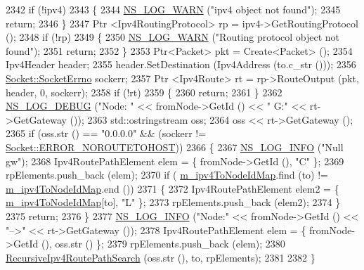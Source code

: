 \begin{DoxyCode}
2342   \textcolor{keywordflow}{if} (!ipv4)
2343     \{
2344       \hyperlink{group__logging_gade7208b4009cdf0e25783cd26766f559}{NS\_LOG\_WARN} (\textcolor{stringliteral}{"ipv4 object not found"});
2345       \textcolor{keywordflow}{return};
2346     \}
2347   Ptr <Ipv4RoutingProtocol> rp = ipv4->GetRoutingProtocol ();
2348   \textcolor{keywordflow}{if} (!rp)
2349     \{
2350       \hyperlink{group__logging_gade7208b4009cdf0e25783cd26766f559}{NS\_LOG\_WARN} (\textcolor{stringliteral}{"Routing protocol object not found"});
2351       \textcolor{keywordflow}{return};
2352     \}
2353   Ptr<Packet> pkt = Create<Packet> ();
2354   Ipv4Header header;
2355   header.SetDestination (Ipv4Address (to.c\_str ()));
2356   \hyperlink{classns3_1_1Socket_ada1328c5ae0c28cb2a982caf8f6d6cca}{Socket::SocketErrno} sockerr;
2357   Ptr <Ipv4Route> rt = rp->RouteOutput (pkt, header, 0, sockerr);
2358   \textcolor{keywordflow}{if} (!rt)
2359     \{
2360       \textcolor{keywordflow}{return};
2361     \}
2362   \hyperlink{group__logging_ga413f1886406d49f59a6a0a89b77b4d0a}{NS\_LOG\_DEBUG} (\textcolor{stringliteral}{"Node: "} << fromNode->GetId () << \textcolor{stringliteral}{" G:"} << rt->GetGateway ());
2363   std::ostringstream oss;
2364   oss << rt->GetGateway ();
2365   \textcolor{keywordflow}{if} (oss.str () == \textcolor{stringliteral}{"0.0.0.0"} && (sockerr != \hyperlink{classns3_1_1Socket_ada1328c5ae0c28cb2a982caf8f6d6ccaa0f8ecb5a4ddbce3bade35fa12c3d49e8}{Socket::ERROR\_NOROUTETOHOST}))
2366     \{
2367       \hyperlink{group__logging_gafbd73ee2cf9f26b319f49086d8e860fb}{NS\_LOG\_INFO} (\textcolor{stringliteral}{"Null gw"});
2368       Ipv4RoutePathElement elem = \{ fromNode->GetId (), \textcolor{stringliteral}{"C"} \};
2369       rpElements.push\_back (elem);
2370       \textcolor{keywordflow}{if} ( \hyperlink{classns3_1_1AnimationInterface_ae8061a2f8540660d0fa851e98d8c7565}{m\_ipv4ToNodeIdMap}.find (to) != \hyperlink{classns3_1_1AnimationInterface_ae8061a2f8540660d0fa851e98d8c7565}{m\_ipv4ToNodeIdMap}.end ())
2371         \{
2372           Ipv4RoutePathElement elem2 = \{ \hyperlink{classns3_1_1AnimationInterface_ae8061a2f8540660d0fa851e98d8c7565}{m\_ipv4ToNodeIdMap}[to], \textcolor{stringliteral}{"L"} \};
2373           rpElements.push\_back (elem2);
2374         \}
2375       \textcolor{keywordflow}{return};
2376     \}
2377   \hyperlink{group__logging_gafbd73ee2cf9f26b319f49086d8e860fb}{NS\_LOG\_INFO} (\textcolor{stringliteral}{"Node:"} << fromNode->GetId () << \textcolor{stringliteral}{"-->"} << rt->GetGateway ()); 
2378   Ipv4RoutePathElement elem = \{ fromNode->GetId (), oss.str () \};
2379   rpElements.push\_back (elem);
2380   \hyperlink{classns3_1_1AnimationInterface_acbffe52eaabf803a624ba0452b226017}{RecursiveIpv4RoutePathSearch} (oss.str (), to, rpElements);
2381 
2382 \}
\end{DoxyCode}


